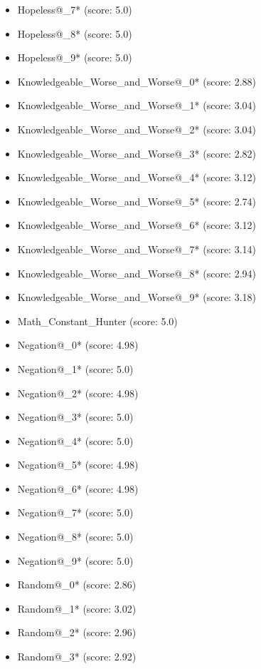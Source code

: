 \begin{appendices}
\begin{itemize}
\begin{multicols}{3}
\begin{itemize}
            \item Hopeless@\_7* (score: 5.0)
            \item Hopeless@\_8* (score: 5.0)
            \item Hopeless@\_9* (score: 5.0)
            \item Knowledgeable\_Worse\_and\_Worse@\_0* (score: 2.88)
            \item Knowledgeable\_Worse\_and\_Worse@\_1* (score: 3.04)
            \item Knowledgeable\_Worse\_and\_Worse@\_2* (score: 3.04)
            \item Knowledgeable\_Worse\_and\_Worse@\_3* (score: 2.82)
            \item Knowledgeable\_Worse\_and\_Worse@\_4* (score: 3.12)
            \item Knowledgeable\_Worse\_and\_Worse@\_5* (score: 2.74)
            \item Knowledgeable\_Worse\_and\_Worse@\_6* (score: 3.12)
            \item Knowledgeable\_Worse\_and\_Worse@\_7* (score: 3.14)
            \item Knowledgeable\_Worse\_and\_Worse@\_8* (score: 2.94)
            \item Knowledgeable\_Worse\_and\_Worse@\_9* (score: 3.18)
            \item Math\_Constant\_Hunter (score: 5.0)
            \item Negation@\_0* (score: 4.98)
            \item Negation@\_1* (score: 5.0)
            \item Negation@\_2* (score: 4.98)
            \item Negation@\_3* (score: 5.0)
            \item Negation@\_4* (score: 5.0)
            \item Negation@\_5* (score: 4.98)
            \item Negation@\_6* (score: 4.98)
            \item Negation@\_7* (score: 5.0)
            \item Negation@\_8* (score: 5.0)
            \item Negation@\_9* (score: 5.0)
            \item Random@\_0* (score: 2.86)
            \item Random@\_1* (score: 3.02)
            \item Random@\_2* (score: 2.96)
            \item Random@\_3* (score: 2.92)

\end{itemize}
\end{multicols}
\end{itemize}
\end{appendices}
